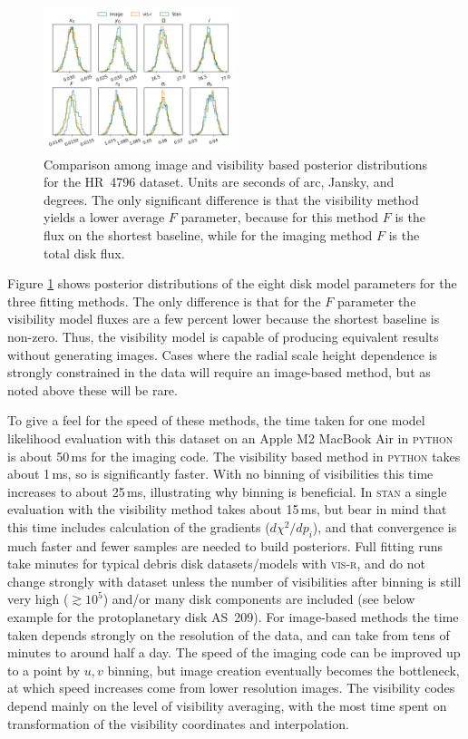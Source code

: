 \documentclass[fleqn,usenatbib]{mnras}
\begin{document}
\begin{figure}
    \centering
    \includegraphics[width=0.5\textwidth]{comp.png}
    \caption{Comparison among image and visibility based posterior distributions for the HR~4796 dataset. Units are seconds of arc, Jansky, and degrees. The only significant difference is that the visibility method yields a lower average $F$ parameter, because for this method $F$ is the flux on the shortest baseline, while for the imaging method $F$ is the total disk flux.}
    \label{fig:comp}
\end{figure}

Figure \ref{fig:comp} shows posterior distributions of the eight disk model parameters for the three fitting methods. The only difference is that for the $F$ parameter the visibility model fluxes are a few percent lower because the shortest baseline is non-zero. Thus, the visibility model is capable of producing equivalent results without generating images. Cases where the radial scale height dependence is strongly constrained in the data will require an image-based method, but as noted above these will be rare.

To give a feel for the speed of these methods, the time taken for one model likelihood evaluation with this dataset on an Apple M2 MacBook Air in \textsc{python} is about 50\,ms for the imaging code. The visibility based method in \textsc{python} takes about 1\,ms, so is significantly faster. With no binning of visibilities this time increases to about 25\,ms, illustrating why binning is beneficial. In \textsc{stan} a single evaluation with the visibility method takes about 15\,ms, but bear in mind that this time includes calculation of the gradients ($d \chi^2 / dp_i$), and that convergence is much faster and fewer samples are needed to build posteriors. Full fitting runs take minutes for typical debris disk datasets/models with \textsc{vis-r}, and do not change strongly with dataset unless the number of visibilities after binning is still very high ($\gtrsim$$10^5$) and/or many disk components are included (see below example for the protoplanetary disk AS~209). For image-based methods the time taken depends strongly on the resolution of the data, and can take from tens of minutes to around half a day. The speed of the imaging code can be improved up to a point by $u,v$ binning, but image creation eventually becomes the bottleneck, at which speed increases come from lower resolution images. The visibility codes depend mainly on the level of visibility averaging, with the most time spent on transformation of the visibility coordinates and interpolation.
\end{document}
